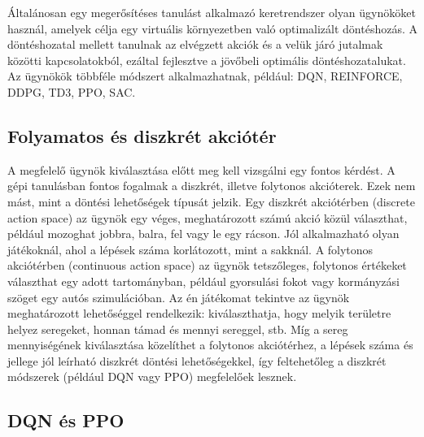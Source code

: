 \documentclass[
]{thesis-ekf}
\theoremstyle{definition}
\theoremstyle{remark}
\begin{document}
	Általánosan egy megerősítéses tanulást alkalmazó keretrendszer olyan ügynököket használ, amelyek célja egy virtuális környezetben való optimalizált döntéshozás. A döntéshozatal mellett tanulnak az elvégzett akciók és a velük járó jutalmak közötti kapcsolatokból, ezáltal fejlesztve a jövőbeli optimális döntéshozatalukat. Az ügynökök többféle módszert alkalmazhatnak, például: DQN, REINFORCE, DDPG, TD3, PPO, SAC.
	
	\subsection{Folyamatos és diszkrét akciótér}
	
	A megfelelő ügynök kiválasztása előtt meg kell vizsgálni egy fontos kérdést. A gépi tanulásban fontos fogalmak a diszkrét, illetve folytonos akcióterek. \cite{ActSpac} Ezek nem mást, mint a döntési lehetőségek típusát jelzik. Egy diszkrét akciótérben (discrete action space) az ügynök egy véges, meghatározott számú akció közül választhat, például mozoghat jobbra, balra, fel vagy le egy rácson. Jól alkalmazható olyan játékoknál, ahol a lépések száma korlátozott, mint a sakknál. A folytonos akciótérben (continuous action space) az ügynök tetszőleges, folytonos értékeket választhat egy adott tartományban, például gyorsulási fokot vagy kormányzási szöget egy autós szimulációban. Az én játékomat tekintve az ügynök meghatározott lehetőséggel rendelkezik: kiválaszthatja, hogy melyik területre helyez seregeket, honnan támad és mennyi sereggel, stb. Míg a sereg mennyiségének kiválasztása közelíthet a folytonos akciótérhez, a lépések száma és jellege jól leírható diszkrét döntési lehetőségekkel, így feltehetőleg a diszkrét módszerek (például DQN vagy PPO) megfelelőek lesznek.
	
	\subsection{DQN és PPO}
	
\end{document}
